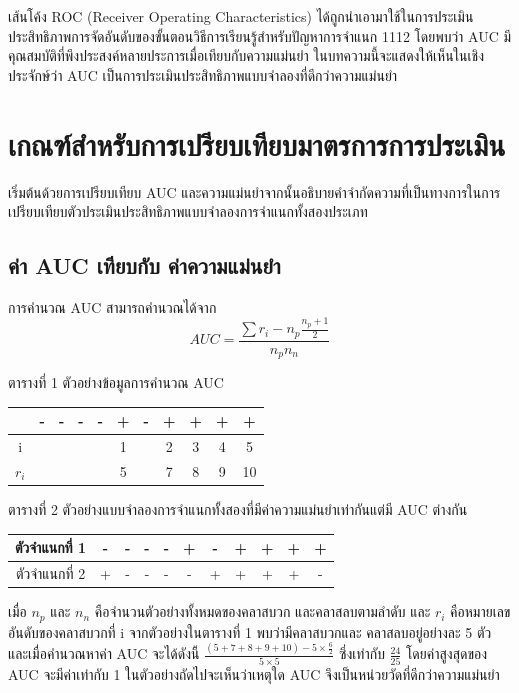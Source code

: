 \documentclass[twoside, twocolumn, 12pt]{article}
\begin{document}
เส้นโค้ง ROC (Receiver Operating Characteristics) ได้ถูกนำเอามาใช้ในการประเมินประสิทธิภาพการจัดอันดับของขั้นตอนวิธีการเรียนรู้สำหรับปัญหาการจำแนก 1112 โดยพบว่า AUC มีคุณสมบัติที่พึงประสงค์หลายประการเมื่อเทียบกับความแม่นยำ 
ในบทความนี้จะแสดงให้เห็นในเชิงประจักษ์ว่า AUC เป็นการประเมินประสิทธิภาพแบบจำลองที่ดีกว่าความแม่นยำ

\section{เกณฑ์สำหรับการเปรียบเทียบมาตรการการประเมิน}
\quad เริ่มต้นด้วยการเปรียบเทียบ AUC และความแม่นยำจากนั้นอธิบายคำจำกัดความที่เป็นทางการในการเปรียบเทียบตัวประเมินประสิทธิภาพแบบจำลองการจำแนกทั้งสองประเภท
\subsection{ค่า AUC เทียบกับ ค่าความแม่นยำ}
\quad การคำนวณ AUC สามารถคำนวณได้จาก\cite{1}
\begin{equation}
AUC = \frac{\sum r_i-n_p\frac{n_p + 1}{2}}{n_pn_n}
\end{equation}
\begin{center} ตารางที่ 1 ตัวอย่างข้อมูลการคำนวณ AUC \end{center}
\begin{center}
\begin{tabular}{ccccccccccc}
  &-&-&-&-&+&-&+&+&+&+ \\
  \hline
  i&&&&&1&&2&3&4&5 \\
  $r_i$& & & & & 5&&7&8&9&10\\
  \hline  
\end{tabular}
\end{center}
\begin{center} ตารางที่ 2 ตัวอย่างแบบจำลองการจำแนกทั้งสองที่มีค่าความแม่นยำเท่ากันแต่มี AUC ต่างกัน \end{center}
\begin{center}
\begin{tabular}{c|ccccc|ccccc}
  \hline
  ตัวจำแนกที่ 1 &-& -& -& -& +& -& +& +& +& +\\
  \hline
  ตัวจำแนกที่ 2 & +& -& -& -& -& +& +& +& +& -\\
  \hline  
\end{tabular}
\end{center}

เมื่อ $n_p$ และ $n_n$ คือจำนวนตัวอย่างทั้งหมดของคลาสบวก และคลาสลบตามลำดับ และ $r_i$ คือหมายเลขอันดับของคลาสบวกที่ i จากตัวอย่างในตารางที่ 1 พบว่ามีคลาสบวกและ คลาสลบอยู่อย่างละ 5 ตัว และเมื่อคำนวณหาค่า AUC จะได้ดังนี้ $\frac{(5+7+8+9+10)- 5\times\frac{6}{2}}{5\times5}$ ซึ่งเท่ากับ $\frac{24}{25}$ โดยค่าสูงสุดของ AUC จะมีค่าเท่ากับ 1 ในตัวอย่างถัดไปจะเห็นว่าเหตุใด AUC จึงเป็นหน่วยวัดที่ดีกว่าความแม่นยำ
\end{document}
